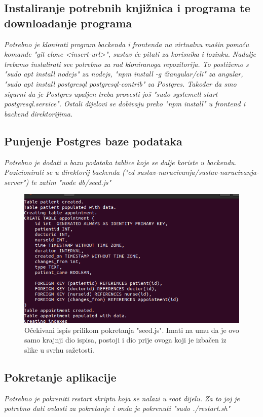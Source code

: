     \subsection{Instaliranje potrebnih knjižnica i programa te downloadanje programa}
    \textit{Potrebno je klonirati program backenda i frontenda na virtualnu mašin pomoću komande "git clone <insert-url>", sustav će pitati za korisnika i lozinku. Nadalje trebamo instalirati sve potrebno za rad kloniranoga repozitorija. To postižemo s "sudo apt install nodejs" za nodejs, "npm install -g @angular/cli" za angular, "sudo apt install postgresql postgresql-contrib" za Postgres. Također da smo sigurni da je Postgres upaljen treba provesti još "sudo systemctl start postgresql.service". Ostali dijelovi se dobivaju preko "npm install" u frontend i backend direktorijima.}

    \subsection{Punjenje Postgres baze podataka}
    \textit{Potrebno je dodati u bazu podataka tablice koje se dalje koriste u backendu. Pozicionirati se u direktorij backenda ("cd sustav-narucivanja/sustav-narucivanja-server") te zatim "node db/seed.js"}
    \begin{figure}[H]
        \includegraphics[width=\textwidth]{slike/deploy/seed.png} %
        \caption{Očekivani ispis prilikom pokretanja "seed.js". Imati na umu da je ovo samo krajnji dio ispisa, postoji i dio prije ovoga koji je izbačen iz slike u svrhu sažetosti.}
        \label{fig:struktura} %
    \end{figure}

    \subsection{Pokretanje aplikacije}
    \textit{Potrebno je pokreniti restart skriptu koja se nalazi u root dijelu. Za to joj je potrebno dati ovlasti za pokretanje i onda je pokrenuti "sudo ./restart.sh" }
			

			
			\eject 